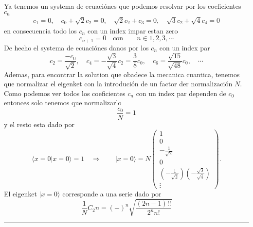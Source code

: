 Ya tenemos un systema de ecuaciónes que podemos resolvar por los coeficientes
$c_n$
\begin{align*}
	c_1 = 0, \quad c_0 + \sqrt 2 c_2 = 0, \quad  \sqrt 2 c_2 + c_3 = 0, \quad
\sqrt 3 c_2 + \sqrt 4 c_4 = 0
\end{align*}
en consecuencia todo los $c_n$ con un index impar estan zero
$$
	c_{n+1} = 0 \quad \text{con} \qquad n \in 1, 2, 3, \cdots
$$
De hecho el systema de ecuaciónes danos por los $c_n$ con un index par 
$$
	c_2 = \frac{-c_0}{\sqrt 2}, \quad c_4 = - \frac{\sqrt 3}{\sqrt 4}c_2 =
\frac{3}{8}c_0, \quad c_6 = \frac{\sqrt{15}}{\sqrt{48}} c_0, \quad
\cdots
$$
Ademas, para encontrar la solution que obadece la mecanica cuantica, tenemos que
normalizar el eigenket con la introdución de un factor der normalización $N$.
Como podemos ver todos los coeficientes $c_n$ con un index par dependen de $c_0$
entonces solo tenemos que normalizarlo
$$ 
	\frac{c_0}{N} = 1
$$ 
y el resto esta dado por
$$
	\langle x = 0| x = 0\rangle = 1 \quad \Rightarrow \qquad | x=0 \rangle = N
\begin{pmatrix}
	1 \\ 0 \\ - \frac{1}{\sqrt 2} \\ 0 \\ \left(-\frac{1}{\sqrt
2}\right)\left(-\frac{\sqrt 3}{\sqrt 4}\right) \\ \vdots  
	\end{pmatrix}.
$$
El eigenket $|x=0\rangle$ corresponde a una serie dado por
$$
	\frac{1}{N} C_2n = (-)^n \sqrt{\frac{(2n-1)!!}{2^n n!}}
$$
	
\rule{\textwidth}{1pt}

	

